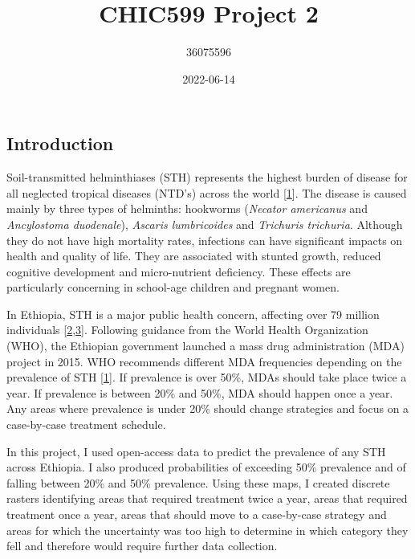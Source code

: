 \documentclass[
]{article}
\title{CHIC599 Project 2}
\author{36075596}
\date{2022-06-14}
\begin{document}
\maketitle

\hypertarget{introduction}{%
\subsection{Introduction}\label{introduction}}

Soil-transmitted helminthiases (STH) represents the highest burden of
disease for all neglected tropical diseases (NTD's) across the world
{[}\protect\hyperlink{ref-worldhealthorganizationEliminatingSoiltransmittedHelminthiases2012}{1}{]}.
The disease is caused mainly by three types of helminths: hookworms
(\emph{Necator americanus} and \emph{Ancylostoma duodenale}),
\emph{Ascaris lumbricoides} and \emph{Trichuris trichuria}. Although
they do not have high mortality rates, infections can have significant
impacts on health and quality of life. They are associated with stunted
growth, reduced cognitive development and micro-nutrient deficiency.
These effects are particularly concerning in school-age children and
pregnant women.

In Ethiopia, STH is a major public health concern, affecting over 79
million individuals
{[}\protect\hyperlink{ref-sartoriusPrevalenceIntensitySoiltransmitted2021}{2},\protect\hyperlink{ref-aemiroPrevalenceSoilTransmittedHelminthes2022}{3}{]}.
Following guidance from the World Health Organization (WHO), the
Ethiopian government launched a mass drug administration (MDA) project
in 2015. WHO recommends different MDA frequencies depending on the
prevalence of STH
{[}\protect\hyperlink{ref-worldhealthorganizationEliminatingSoiltransmittedHelminthiases2012}{1}{]}.
If prevalence is over 50\%, MDAs should take place twice a year. If
prevalence is between 20\% and 50\%, MDA should happen once a year. Any
areas where prevalence is under 20\% should change strategies and focus
on a case-by-case treatment schedule.

In this project, I used open-access data to predict the prevalence of
any STH across Ethiopia. I also produced probabilities of exceeding 50\%
prevalence and of falling between 20\% and 50\% prevalence. Using these
maps, I created discrete rasters identifying areas that required
treatment twice a year, areas that required treatment once a year, areas
that should move to a case-by-case strategy and areas for which the
uncertainty was too high to determine in which category they fell and
therefore would require further data collection.
\end{document}
